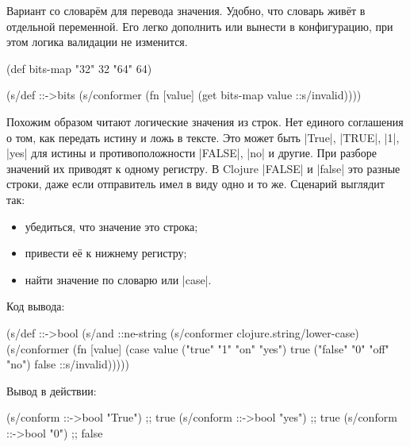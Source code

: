 
Вариант со словар\"{е}м для перевода значения. Удобно, что словарь жив\"{е}т в
отдельной переменной. Его легко дополнить или вынести в конфигурацию, при этом
логика валидации не изменится.

\begin{english}
  \begin{clojure}
(def bits-map {"32" 32 "64" 64})

(s/def ::->bits
  (s/conformer
   (fn [value]
     (get bits-map value ::s/invalid))))
  \end{clojure}
\end{english}

Похожим образом читают логические значения из строк. Нет единого соглашения о
том, как передать истину и ложь в тексте. Это может быть \spverb|True|,
\spverb|TRUE|, \spverb|1|, \spverb|yes| для истины и противоположности
\spverb|FALSE|, \spverb|no| и другие. При разборе значений их приводят к одному
регистру. В Clojure \spverb|FALSE| и \spverb|false| это разные строки, даже если
отправитель имел в виду одно и то же. Сценарий выглядит так:

\begin{itemize}

\item
  убедиться, что значение это строка;

\item
  привести е\"{е} к нижнему регистру;

\item
  найти значение по словарю или \spverb|case|.

\end{itemize}

\noindent
Код вывода:

\begin{english}
  \begin{clojure}
(s/def ::->bool
  (s/and
   ::ne-string
   (s/conformer clojure.string/lower-case)
   (s/conformer
    (fn [value]
      (case value
        ("true" "1" "on" "yes") true
        ("false" "0" "off" "no") false
        ::s/invalid)))))

  \end{clojure}
\end{english}

\noindent
Вывод в действии:

\begin{english}
  \begin{clojure}
(s/conform ::->bool "True") ;; true
(s/conform ::->bool "yes")  ;; true
(s/conform ::->bool "0")    ;; false
  \end{clojure}
\end{english}

